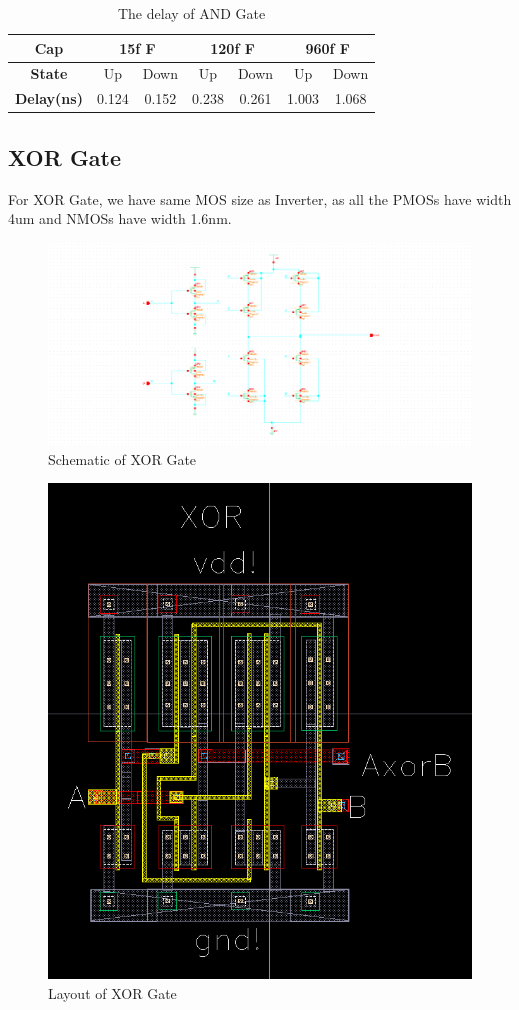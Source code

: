 \documentclass[conference]{IEEEtran}
\begin{document}
\begin{table}[h]
    \caption{The delay of AND Gate}
    \begin{center}
        \begin{tabular}{|c|c|c|c|c|c|c|}
            \hline
            \textbf{Cap} & \multicolumn{2}{|c|}{15f F} & \multicolumn{2}{|c|}{120f F} & \multicolumn{2}{|c|}{960f F} \\
            \hline
            \textbf{State} & Up & Down & Up & Down & Up & Down \\
            \hline
            \textbf{Delay(ns)} & 0.124  & 0.152 & 0.238 & 0.261 & 1.003 & 1.068 \\
            \hline
        \end{tabular}
    \end{center}
    \label{The delay of AND}
\end{table}

\subsection{XOR Gate}

For XOR Gate, we have same MOS size as Inverter, as all the PMOSs have width 4um and NMOSs have width 1.6nm.

\begin{figure}[H]
    \centering
    \includegraphics[width = 0.9\linewidth]{xor2_schematic.png}
    \caption{Schematic of XOR Gate}
    \label{Schematic of XOR Gate}
\end{figure}

\begin{figure}[H]
    \centering
    \includegraphics[width = 0.6\linewidth]{xor2_layout.png}
    \caption{Layout of XOR Gate}
    \label{Layout of XOR Gate}
\end{figure}
\end{document}

